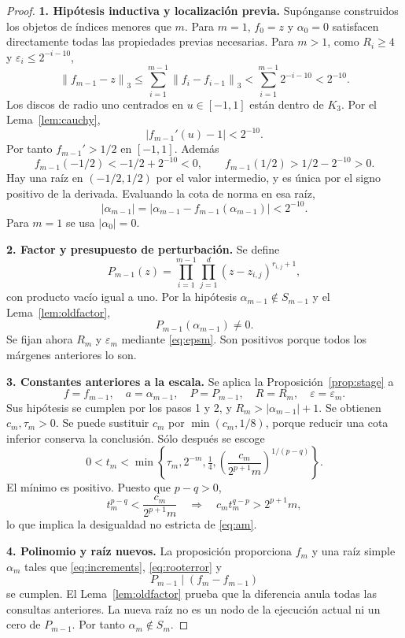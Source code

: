 \documentclass[11pt,a4paper]{article}
\numberwithin{equation}{section}
\theoremstyle{definition}
\theoremstyle{remark}
\newcommand{\norm}[1]{\left\lVert#1\right\rVert}
\newcommand{\paso}[1]{\par\smallskip\noindent\textbf{#1}\quad}
\begin{document}
\begin{proof}
\paso{1. Hipótesis inductiva y localización previa.}
Supónganse construidos los objetos de índices menores que $m$. Para $m=1$, $f_0=z$ y $\alpha_0=0$ satisfacen directamente todas las propiedades previas necesarias. Para $m>1$, como $R_i\ge4$ y $\varepsilon_i\le2^{-i-10}$,
\[
\norm{f_{m-1}-z}_3
\le\sum_{i=1}^{m-1}\norm{f_i-f_{i-1}}_3
<\sum_{i=1}^{m-1}2^{-i-10}<2^{-10}.
\]
Los discos de radio uno centrados en $u\in[-1,1]$ están dentro de $K_3$. Por el Lema~\ref{lem:cauchy},
\[
|f_{m-1}'(u)-1|<2^{-10}.
\]
Por tanto $f_{m-1}'>1/2$ en $[-1,1]$. Además
\[
f_{m-1}(-1/2)<-1/2+2^{-10}<0,\qquad
f_{m-1}(1/2)>1/2-2^{-10}>0.
\]
Hay una raíz en $(-1/2,1/2)$ por el valor intermedio, y es única por el signo positivo de la derivada. Evaluando la cota de norma en esa raíz,
\[
|\alpha_{m-1}|=|\alpha_{m-1}-f_{m-1}(\alpha_{m-1})|<2^{-10}.
\]
Para $m=1$ se usa $|\alpha_0|=0$.

\paso{2. Factor y presupuesto de perturbación.}
Se define
\begin{equation}\label{eq:Pm}
P_{m-1}(z)=\prod_{i=1}^{m-1}\prod_{j=1}^{d}
(z-z_{i,j})^{r_{i,j}+1},
\end{equation}
con producto vacío igual a uno. Por la hipótesis $\alpha_{m-1}\notin S_{m-1}$ y el Lema~\ref{lem:oldfactor},
\[
P_{m-1}(\alpha_{m-1})\ne0.
\]
Se fijan ahora $R_m$ y $\varepsilon_m$ mediante \eqref{eq:epsm}. Son positivos porque todos los márgenes anteriores lo son.

\paso{3. Constantes anteriores a la escala.}
Se aplica la Proposición~\ref{prop:stage} a
\[
f=f_{m-1},\quad a=\alpha_{m-1},\quad
P=P_{m-1},\quad R=R_m,\quad\varepsilon=\varepsilon_m.
\]
Sus hipótesis se cumplen por los pasos 1 y 2, y $R_m>|\alpha_{m-1}|+1$. Se obtienen $c_m,\tau_m>0$. Se puede sustituir $c_m$ por $\min(c_m,1/8)$, porque reducir una cota inferior conserva la conclusión. Sólo después se escoge
\begin{equation}\label{eq:choose-tm}
0<t_m<\min\left\{\tau_m,2^{-m},\tfrac14,
\left(\frac{c_m}{2^{p+1}m}\right)^{1/(p-q)}\right\}.
\end{equation}
El mínimo es positivo. Puesto que $p-q>0$,
\[
t_m^{p-q}<\frac{c_m}{2^{p+1}m}
\quad\Longrightarrow\quad
c_mt_m^{q-p}>2^{p+1}m,
\]
lo que implica la desigualdad no estricta de \eqref{eq:am}.

\paso{4. Polinomio y raíz nuevos.}
La proposición proporciona $f_m$ y una raíz simple $\alpha_m$ tales que \eqref{eq:increments}, \eqref{eq:rooterror} y
\[
P_{m-1}\mid(f_m-f_{m-1})
\]
se cumplen. El Lema~\ref{lem:oldfactor} prueba que la diferencia anula todas las consultas anteriores. La nueva raíz no es un nodo de la ejecución actual ni un cero de $P_{m-1}$. Por tanto $\alpha_m\notin S_m$.


\end{proof}
\end{document}
